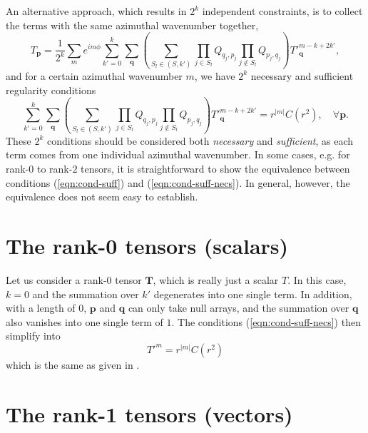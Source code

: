\documentclass[a4paper, 11pt]{article}
\begin{document}
An alternative approach, which results in $2^k$ independent constraints, is to collect the terms with the same azimuthal wavenumber together, 
\[
    T_\mathbf{p} = \frac{1}{2^k} \sum_m e^{im\phi} \sum_{k'=0}^k \sum_\mathbf{q} \left(\sum_{S_l \in (S, k')} \prod_{j\in S_l} Q_{q_j,p_j} \prod_{j\notin S_l} Q_{p_{j},q_{j}}\right) T'^{m-k+2k'}_\mathbf{q},
\]
and for a certain azimuthal wavenumber $m$, we have $2^k$ necessary and sufficient regularity conditions
\begin{equation}\label{eqn:cond-suff-necs}
    \sum_{k'=0}^k \sum_{\mathbf{q}} \left(\sum_{S_l \in (S, k')} \prod_{j\in S_l} Q_{q_j,p_j} \prod_{j\notin S_l} Q_{p_{j},q_{j}}\right) T'^{m-k+2k'}_\mathbf{q} = r^{|m|} C(r^2),\quad \forall \mathbf{p}.
\end{equation}
These $2^k$ conditions should be considered both \textit{necessary} and \textit{sufficient}, as each term comes from one individual azimuthal wavenumber. In some cases, e.g. for rank-$0$ to rank-$2$ tensors, it is straightforward to show the equivalence between conditions (\ref{eqn:cond-suff}) and (\ref{eqn:cond-suff-necs}). In general, however, the equivalence does not seem easy to establish.


\section{The rank-0 tensors (scalars)}

Let us consider a rank-$0$ tensor $\mathbf{T}$, which is really just a scalar $T$. In this case, $k=0$ and the summation over $k'$ degenerates into one single term. In addition, with a length of $0$, $\mathbf{p}$ and $\mathbf{q}$ can only take null arrays, and the summation over $\mathbf{q}$ also vanishes into one single term of $1$. The conditions (\ref{eqn:cond-suff-necs}) then simplify into
\begin{equation}
    T'^m = r^{|m|} C(r^2)
\end{equation}
which is the same as given in \textcite{lewis_physical_1990}.


\section{The rank-1 tensors (vectors)}
\end{document}
